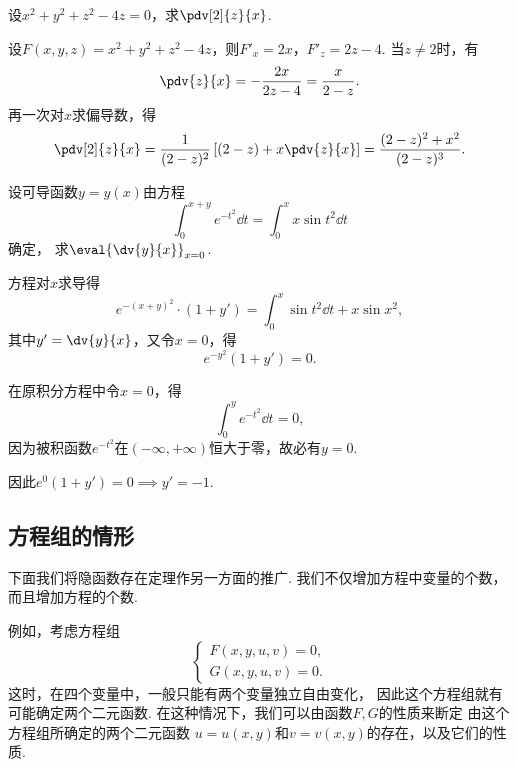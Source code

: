 \begin{example}
设\(x^2+y^2+z^2-4z=0\)，求\(\pdv[2]{z}{x}\).
\begin{solution}
设\(F(x,y,z) = x^2+y^2+z^2-4z\)，则\(F'_x = 2x\)，\(F'_z = 2z-4\).
当\(z\neq2\)时，有\begin{equation*}
	\pdv{z}{x} = -\frac{2x}{2z-4} = \frac{x}{2-z}.
\end{equation*}
再一次对\(x\)求偏导数，得\begin{equation*}
	\pdv[2]{z}{x}
	= \frac{1}{(2-z)^2} \left[ (2-z)+x\pdv{z}{x} \right]
	= \frac{(2-z)^2+x^2}{(2-z)^3}.
\end{equation*}
\end{solution}
\end{example}

\begin{example}
设可导函数\(y = y(x)\)由方程\begin{equation*}
	\int_0^{x+y} e^{-t^2} \dd{t}
	= \int_0^x x \sin t^2 \dd{t}
\end{equation*}确定，
求\(\eval{\dv{y}{x}}_{x=0}\).
\begin{solution}
方程对\(x\)求导得\begin{equation*}
	e^{-(x+y)^2} \cdot (1+y')
	= \int_0^x \sin t^2 \dd{t} + x \sin x^2,
\end{equation*}
其中\(y' = \dv{y}{x}\)，又令\(x=0\)，得\begin{equation*}
	e^{-y^2} (1+y') = 0.
\end{equation*}

在原积分方程中令\(x=0\)，得\begin{equation*}
	\int_0^y e^{-t^2} \dd{t} = 0,
\end{equation*}
因为被积函数\(e^{-t^2}\)在\((-\infty,+\infty)\)恒大于零，故必有\(y = 0\).

因此\(e^0 (1+y') = 0 \implies y'=-1\).
\end{solution}
\end{example}

\subsection{方程组的情形}
下面我们将隐函数存在定理作另一方面的推广.
我们不仅增加方程中变量的个数，而且增加方程的个数.

例如，考虑方程组\begin{equation*}
	\left\{ \begin{array}{c}
		F(x,y,u,v)=0, \\
		G(x,y,u,v)=0.
	\end{array} \right.
\end{equation*}
这时，在四个变量中，一般只能有两个变量独立自由变化，
因此这个方程组就有可能确定两个二元函数.
在这种情况下，我们可以由函数\(F,G\)的性质来断定
由这个方程组所确定的两个二元函数
\(u=u(x,y)\)和\(v=v(x,y)\)的存在，以及它们的性质.

